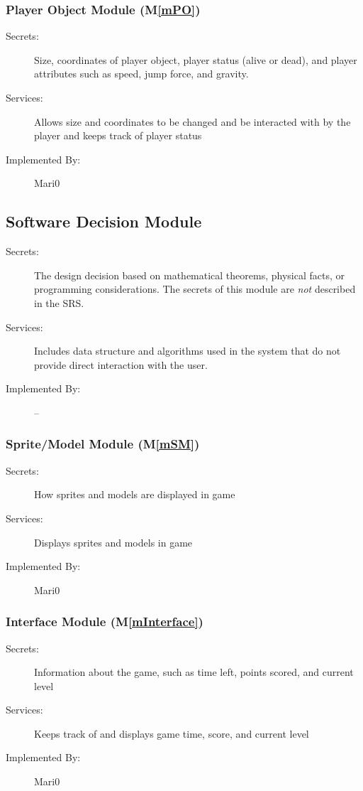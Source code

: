 \documentclass[12pt, titlepage]{article}
\newcommand{\mref}[1]{M\ref{#1}}
\begin{document}
\subsubsection{Player Object Module (\mref{mPO})}
\begin{description}
\item[Secrets:]Size, coordinates of player object, player status (alive or dead), and player attributes such as speed, jump force, and gravity.
\item[Services:]Allows size and coordinates to be changed and be interacted with by the player and keeps track of player status
\item[Implemented By:] Mari0
\end{description}

\subsection{Software Decision Module}

\begin{description}
\item[Secrets:] The design decision based on mathematical theorems, physical
  facts, or programming considerations. The secrets of this module are
  \emph{not} described in the SRS.
\item[Services:] Includes data structure and algorithms used in the system that
  do not provide direct interaction with the user. 
\item[Implemented By:] --
\end{description}

\subsubsection{Sprite/Model Module (\mref{mSM})}
\begin{description}
\item[Secrets:]How sprites and models are displayed in game
\item[Services:]Displays sprites and models in game
\item[Implemented By:] Mari0
\end{description}

\subsubsection{Interface Module (\mref{mInterface})}
\begin{description}
\item[Secrets:]Information about the game, such as time left, points scored, and current level
\item[Services:]Keeps track of and displays game time, score, and current level
\item[Implemented By:] Mari0
\end{description}
\end{document}
